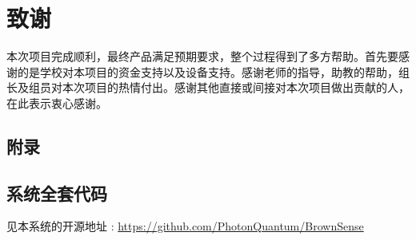 \documentclass[UTF8]{ctexart}
\begin{document}
\newpage
\section*{致谢}
本次项目完成顺利，最终产品满足预期要求，整个过程得到了多方帮助。首先要感谢的是学校对本项目的资金支持以及设备支持。感谢老师的指导，助教的帮助，组长及组员对本次项目的热情付出。感谢其他直接或间接对本次项目做出贡献的人，在此表示衷心感谢。

\begin{appendix}
\section{附录}
\subsection{系统全套代码}
见本系统的开源地址 : \url{https://github.com/PhotonQuantum/BrownSense}
\end{appendix}

\pagebreak
\end{document}
